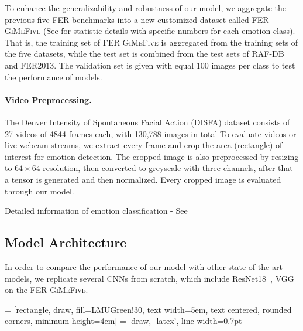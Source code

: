 To enhance the generalizability and robustness of our model, 
we aggregate the previous five FER benchmarks into a new customized dataset called FER \textsc{GiMeFive} 
(See  for statistic details with specific numbers for each emotion class). 
That is, 
the training set of FER \textsc{GiMeFive} is aggregated from the training sets of the five datasets, 
while the test set is combined from the test sets of RAF-DB and FER2013. 
The validation set is given with equal 100 images per class to test the performance of models. 

\paragraph{Video Preprocessing.} %
The Denver Intensity of Spontaneous Facial Action (DISFA) dataset consists of 27 videos of 4844 frames each, with 130,788 images in total
To evaluate videos or live webcam streams, we extract every frame and crop the area (rectangle) of interest for emotion detection.  
The cropped image is also preprocessed by resizing to $64 \times 64$ resolution, 
then converted to greyscale with three channels, 
after that a tensor is generated and then normalized. 
Every cropped image is evaluated through our model.

Detailed information of emotion classification - See  %

\subsection{Model Architecture}
\label{sec:setup:model}

In order to compare the performance of our model with other state-of-the-art models, 
we replicate several CNNs from scratch, 
which include ResNet18~\cite{HeZRS16}, 
VGG~\cite{SimonyanZ14a} on the FER \textsc{GiMeFive}. 

 = [rectangle, draw, fill=LMUGreen!30, text width=5em, text centered, rounded corners, minimum height=4em]
 = [draw, -latex', line width=0.7pt]

